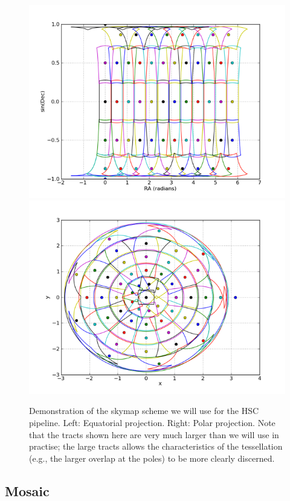 \documentclass[12pt]{article}
\begin{document}
{\begin{figure}[!htbp]
    \centering
    \includegraphics[scale=0.3]{figures/rings_equat.png}
    \includegraphics[scale=0.3]{figures/rings_pole.png}
    \caption{Demonstration of the skymap scheme we will use for the HSC pipeline.  Left: Equatorial
      projection.  Right: Polar projection.  Note that the tracts shown here are very much larger than we will
      use in practise; the large tracts allows the characteristics of the tessellation (e.g., the larger
      overlap at the poles) to be more clearly discerned.\label{fig:skymap}}
\end{figure}

\subsection{Mosaic}
\label{alg:mosaic}

}
\end{document}

